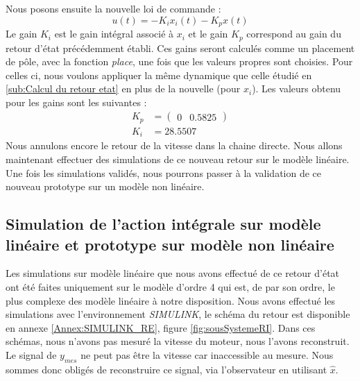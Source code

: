 Nous posons ensuite la nouvelle loi de commande :\begin{equation}
		\label{eqn:loideCommande_retourIntegral}
		u(t) = -K_ix_i(t) - K_px(t)
\end{equation}
		Le gain $K_i$ est le gain intégral associé à $x_i$ et le gain $K_p$ correspond au gain du retour d'état précédemment établi. Ces gains seront calculés comme un placement de pôle, avec la fonction \emph{place}, une fois que les valeurs propres sont choisies. Pour celles ci, nous voulons appliquer la même dynamique que celle étudié en \ref{sub:Calcul du retour etat} en plus de la nouvelle (pour $x_i$). Les valeurs obtenu pour les gains sont les suivantes :
		\begin{align}
		K_p &= \begin{pmatrix}
		0&0.5825  
		\end{pmatrix}\\
		K_i &=  28.5507
 		\end{align}
 		Nous annulons encore le retour de la vitesse dans la chaine directe. Nous allons maintenant effectuer des simulations de ce nouveau retour sur le modèle linéaire. Une fois les simulations validés, nous pourrons passer à la validation de ce nouveau prototype sur un modèle non linéaire.
		\subsection{Simulation de l'action intégrale sur modèle linéaire et prototype sur modèle non linéaire}
		Les simulations sur modèle linéaire que nous avons effectué de ce retour d'état ont été faites uniquement sur le modèle d'ordre 4 qui est, de par son ordre, le plus complexe des modèle linéaire à notre disposition. Nous avons effectué les simulations avec l'environnement \emph{SIMULINK}, le schéma du retour est disponible en annexe \ref{Annex:SIMULINK_RE}, figure \ref{fig:sousSystemeRI}. Dans ces schémas, nous n'avons pas mesuré la vitesse du moteur, nous l'avons reconstruit. Le signal de $y_{mes}$ ne peut pas être la vitesse car inaccessible au mesure. Nous sommes donc obligés de reconstruire ce signal, via l'observateur en utilisant $\hat{x}$.	 
		

